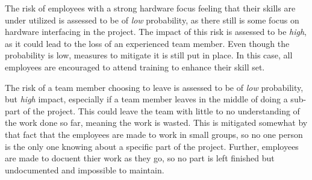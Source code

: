\documentclass[Main]{subfiles}
\begin{document}
	The risk of employees with a strong hardware focus feeling that their skills are under utilized is assessed to be of \emph{low} probability, as there still is some focus on hardware interfacing in the project.
	The impact of this risk is assessed to be \emph{high}, as it could lead to the loss of an experienced team member.
	Even though the probability is low, measures to mitigate it is still put in place.
	In this case, all employees are encouraged to attend training to enhance their skill set.

	The risk of a team member choosing to leave is assessed to be of \emph{low} probability, but \emph{high} impact, especially if a team member leaves in the middle of doing a sub-part of the project. 
	This could leave the team with little to no understanding of the work done so far, meaning the work is wasted.
	This is mitigated somewhat by that fact that the employees are made to work in small groups, so no one person is the only one knowing about a specific part of the project.
	Further, employees are made to docuent thier work as they go, so no part is left finished but undocumented and impossible to maintain.







\end{document}
